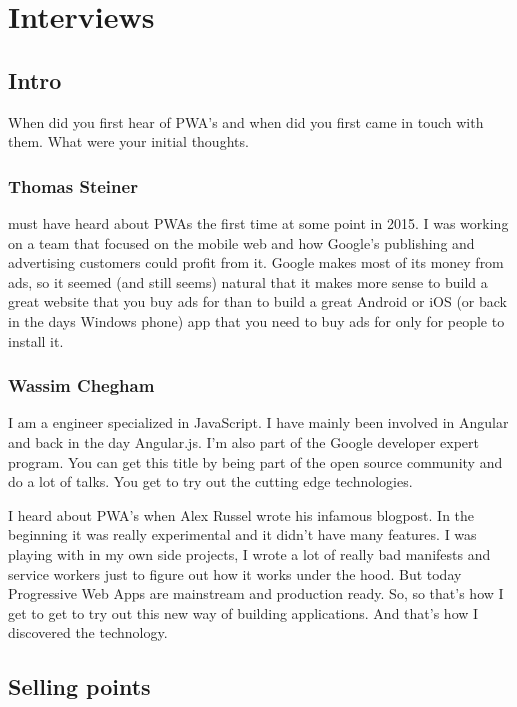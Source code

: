 \chapter{Interviews}
\label{ch:Interview}



	\section{Intro}
	
		When did you first hear of PWA's and when did you first came in touch with them. What were your initial thoughts. 
	
		\subsection{Thomas Steiner}
		
			 must have heard about PWAs the first time at some point in 2015. I was working on a team that focused on the mobile web and how Google’s publishing and advertising customers could profit from it. Google makes most of its money from ads, so it seemed (and still seems) natural that it makes more sense to build a great website that you buy ads for than to build a great Android or iOS (or back in the days Windows phone) app that you need to buy ads for only for people to install it.
		
		\subsection{Wassim Chegham}
		
			I am a engineer specialized in JavaScript. I have mainly been involved in Angular and back in the day Angular.js. I'm also part of the Google developer expert program. You can get this title by being part of the open source community and do a lot of talks. You get to try out the cutting edge technologies. 
		
			I heard about PWA's when Alex Russel wrote his infamous blogpost. In the beginning it was really experimental and it didn't have many features. I was playing with in my own side projects, I wrote a lot of really bad manifests and service workers just to figure out how it works under the hood. But today Progressive Web Apps are mainstream and production ready.  So, so that's how I get to get to try out this new way of building applications. And that's how I discovered the technology.
		
	
	\section{Selling points}
	
